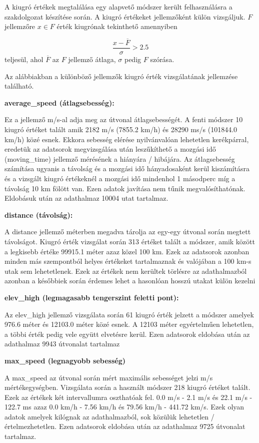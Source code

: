 A kiugró értékek megtalálása egy alapvető módszer került felhasználásra a szakdolgozat készítése során. A kiugró értékeket jellemzőként külön vizsgáljuk. $F$ jellemzőre $x \in F$ érték kiugrónak tekinthető amennyiben

\[  \frac{x - \overline{F}}{\sigma} > 2.5\]
teljesül, ahol $\overline{F}$ az $F$ jellemző átlaga, $\sigma$ pedig $F$ szórása.

Az alábbiakban a különböző jellemzők kiugró érték vizsgálatának jellemzése található.

\textbf{average\_speed (átlagsebesség):}

Ez a jellemző m/s-al adja meg az útvonal átlagsebességét. A fenti módszer 10 kiugró értéket talált amik 2182 m/s (7855.2 km/h) és 28290 ms/s (101844.0 km/h) közé esnek. Ekkora sebesség elérése nyilvánvalóan lehetetlen kerékpárral, eredetük az adatsorok megvizsgálása után leszűkíthető a mozgási idő (moving\_time) jellemző mérésének a hiányára / hibájára. Az átlagsebesség számítása ugyanis a távolság és a mozgási idő hányadosaként kerül kiszámításra és a vizsgált kiugró értékeknél a mozgási idő mindenhol 1 másodperc míg a távolság 10 km fölött van. Ezen adatok javítása nem tűnik megvalósíthatónak. Eldobásuk után az adathalmaz 10004 utat tartalmaz.

\textbf{distance (távolság):}

A distance jellemző méterben megadva tárolja az egy-egy útvonal során megtett távolságot. Kiugró érték vizsgálat során 313 értéket talált a módszer, amik között a legkisebb értéke 99915.1 méter azaz közel 100 km. Ezek az adatsorok azonban minden más szempontból helyes értékeket tartalmaznak és valójában a 100 km-s utak sem lehetetlenek. Ezek az értékek nem kerültek törlésre az adathalmazból azonban a későbbiek során érdemes lehet a hasonlóan hosszú utakat külön kezelni

\textbf{elev\_high (legmagasabb tengerszint feletti pont):}

Az elev\_high jellemző vizsgálata során 61 kiugró érték jelzett a módszer amelyek 976.6 méter és 12103.0 méter közé esnek. A 12103 méter egyértelműen lehetetlen, a többi érték pedig vele együtt elvetésre kerül. Ezen adatsorok eldobása után az adathalmaz 9943 útvonalat tartalmaz

\textbf{max\_speed (legnagyobb sebesség)}

A max\_speed az útvonal során mért maximális sebességet jelzi m/s mértékegységben. Vizsgálata során a használt módszer 218 kiugró értéket talált. Ezek az értékek két intervallumra oszthatóak fel. 0.0 m/s - 2.1 m/s és 22.1 m/s - 122.7 ms azaz 0.0 km/h - 7.56 km/h és 79.56 km/h - 441.72 km/s. Ezek olyan adatok amelyek kilógnak az adathalmazból, sok közülük lehetetlen / értelmezhetetlen. Ezen adatsorok eldobása után az adathalmaz 9725 útvonalat tartalmaz.

